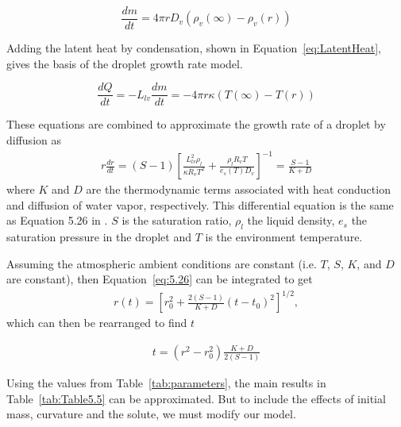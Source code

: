 \documentclass[]{article}
\begin{document}
\begin{equation}
    \label{eq:Diffusion}
    \dfrac{dm}{dt}=4 \pi r D_{v} \left( \rho_{v}(\infty) - \rho_{v}(r) \right)
\end{equation}

Adding the latent heat by condensation, shown in
Equation~\eqref{eq:LatentHeat}, gives the basis of the droplet growth rate
model.

\begin{equation}
    \label{eq:LatentHeat}
    \dfrac{dQ}{dt}=-L_{lv}\dfrac{dm}{dt}=-4 \pi r \kappa \left( T(\infty) - T(r) \right)
\end{equation}

These equations are combined to approximate the growth rate of a droplet by
diffusion as
\begin{align}
    \label{eq:5.26}
    r \frac{dr}{dt} = (S - 1) \left[ \frac{L_{lv}^2 \rho_l}{\kappa R_v T^2} + \frac{\rho_l R_v T}{e_s(T) D_v} \right] ^{-1} = \frac{S - 1}{K + D}
\end{align}
where $K$ and $D$ are the thermodynamic terms associated with heat conduction
and diffusion of water vapor, respectively. This differential equation is the same as Equation 5.26 in \cite{Mason}. $S$ is the saturation ratio, $\rho_l$ the liquid density, $e_s$ the saturation pressure in the droplet and $T$ is the environment temperature.

Assuming the atmospheric ambient conditions are constant (i.e. $T$, $S$, $K$, and
$D$ are constant), then Equation~\eqref{eq:5.26} can be integrated to get
\begin{align}
    \label{eq:5.27}
    r(t) = \left[ r_0^2 + \frac{2(S -1)}{K + D}(t - t_0)^2 \right] ^{1/2},
\end{align}
which can then be rearranged to find $t$

\begin{align}
    \label{eq:5.27T}
    t = (r^2 - r_0^2) \frac{K + D}{2(S - 1)}
\end{align}

Using the values from Table~\ref{tab:parameters}, the main results in
Table~\ref{tab:Table5.5} can be approximated. But to include the effects of initial mass, curvature and the solute, we must modify our model.
\end{document}
